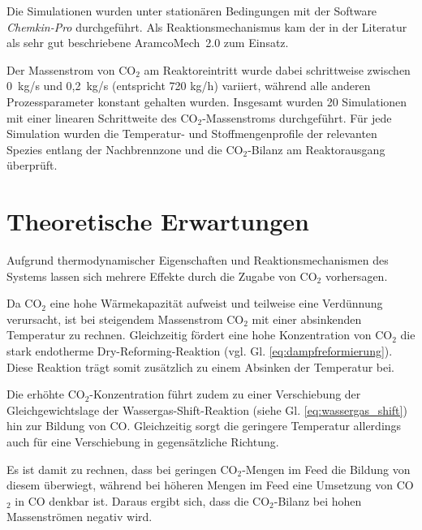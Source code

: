         Die Simulationen wurden unter stationären Bedingungen mit der Software \textit{Chemkin-Pro} durchgeführt. Als Reaktionsmechanismus kam der in der Literatur als sehr gut beschriebene AramcoMech~2.0 zum Einsatz. 
        
        Der Massenstrom von CO$_2$ am Reaktoreintritt wurde dabei schrittweise zwischen 0~kg/s und 0,2~kg/s (entspricht 720 kg/h) variiert, während alle anderen Prozessparameter konstant gehalten wurden. Insgesamt wurden 20 Simulationen mit einer linearen Schrittweite des CO$_2$-Massenstroms durchgeführt. Für jede Simulation wurden die Temperatur- und Stoffmengenprofile der relevanten Spezies entlang der Nachbrennzone und die CO$_2$-Bilanz am Reaktorausgang überprüft.
    \section{Theoretische Erwartungen}
        Aufgrund thermodynamischer Eigenschaften und Reaktionsmechanismen des Systems lassen sich mehrere Effekte durch die Zugabe von CO$_2$ vorhersagen. 

        Da CO$_2$ eine hohe Wärmekapazität aufweist \cite{NIST_CO2_WebBook_General} und teilweise eine Verdünnung verursacht, ist bei steigendem Massenstrom CO$_2$ mit einer absinkenden Temperatur zu rechnen. Gleichzeitig fördert eine hohe Konzentration von CO$_2$ die stark endotherme Dry-Reforming-Reaktion (vgl. Gl. \ref{eq:dampfreformierung}). Diese Reaktion trägt somit zusätzlich zu einem Absinken der Temperatur bei.

        Die erhöhte CO$_2$-Konzentration führt zudem zu einer Verschiebung der Gleichgewichtslage der Wassergas-Shift-Reaktion (siehe Gl. \ref{eq:wassergas_shift}) hin zur Bildung von CO. Gleichzeitig sorgt die geringere Temperatur allerdings auch für eine Verschiebung in gegensätzliche Richtung. 

        Es ist damit zu rechnen, dass bei geringen CO$_2$-Mengen im Feed die Bildung von diesem überwiegt, während bei höheren Mengen im Feed eine Umsetzung von CO$_2$ in CO denkbar ist. Daraus ergibt sich, dass die CO$_2$-Bilanz bei hohen Massenströmen negativ wird. 
        